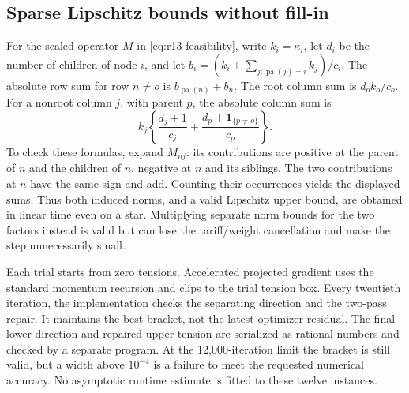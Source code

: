 \documentclass[11pt,letterpaper]{article}
\theoremstyle{definition}
\newcommand{\1}{\mathbf 1}
\begin{document}
\subsection{Sparse Lipschitz bounds without fill-in}
For the scaled operator $M$ in \eqref{eq:r13-feasibility}, write $k_i=\kappa_i$, let $d_i$ be the number of children of node $i$, and let $b_i=(k_i+\sum_{j:\operatorname{pa}(j)=i}k_j)/c_i$. The absolute row sum for row $n\ne o$ is $b_{\operatorname{pa}(n)}+b_n$. The root column sum is $d_ok_o/c_o$. For a nonroot column $j$, with parent $p$, the absolute column sum is
\[
 k_j\left\{\frac{d_j+1}{c_j}+\frac{d_p+\mathbf1_{\{p\ne o\}}}{c_p}\right\}.
\]
To check these formulas, expand $M_{nj}$: its contributions are positive at the parent of $n$ and the children of $n$, negative at $n$ and its siblings. The two contributions at $n$ have the same sign and add. Counting their occurrences yields the displayed sums. Thus both induced norms, and a valid Lipschitz upper bound, are obtained in linear time even on a star. Multiplying separate norm bounds for the two factors instead is valid but can lose the tariff/weight cancellation and make the step unnecessarily small.

Each trial starts from zero tensions. Accelerated projected gradient uses the standard momentum recursion and clips to the trial tension box. Every twentieth iteration, the implementation checks the separating direction and the two-pass repair. It maintains the best bracket, not the latest optimizer residual. The final lower direction and repaired upper tension are serialized as rational numbers and checked by a separate program. At the 12,000-iteration limit the bracket is still valid, but a width above $10^{-4}$ is a failure to meet the requested numerical accuracy. No asymptotic runtime estimate is fitted to these twelve instances.
\end{document}
